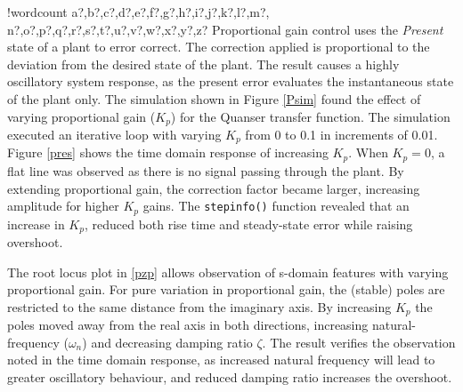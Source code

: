 \documentclass[11pt]{article}
\newcounter{words}
\newenvironment{counted}{%
  \setcounter{words}{0}
  \SearchList!{wordcount}{\stepcounter{words}}
    {a?,b?,c?,d?,e?,f?,g?,h?,i?,j?,k?,l?,m?,
    n?,o?,p?,q?,r?,s?,t?,u?,v?,w?,x?,y?,z?}
  \UndoBoundary{'}
  \SearchOrder{p;}}{%
  \StopSearching}
\begin{document}
\begin{counted}
Proportional gain control uses the \emph{Present} state of a plant to
error correct. The correction applied is proportional to the deviation
from the desired state of the plant. The result causes a highly
oscillatory system response, as the present error evaluates the
instantaneous state of the plant only. The simulation shown in Figure
\ref{Psim} found the effect of varying proportional gain (\(K_p\)) for
the Quanser transfer function. The simulation executed an iterative loop
with varying \(K_p\) from 0 to 0.1 in increments of 0.01. Figure
\ref{pres} shows the time domain response of increasing \(K_p\). When
\(K_p = 0\), a flat line was observed as there is no signal passing
through the plant. By extending proportional gain, the correction factor
became larger, increasing amplitude for higher \(K_p\) gains. The
\texttt{stepinfo()} function revealed that an increase in \(K_p\),
reduced both rise time and steady-state error while raising overshoot.

The root locus plot in \ref{pzp} allows observation of s-domain features
with varying proportional gain. For pure variation in proportional gain,
the (stable) poles are restricted to the same distance from the
imaginary axis. By increasing \(K_p\) the poles moved away from the real
axis in both directions, increasing natural-frequency (\(\omega_n\)) and
decreasing damping ratio \(\zeta\). The result verifies the observation
noted in the time domain response, as increased natural frequency will
lead to greater oscillatory behaviour, and reduced damping ratio
increases the overshoot.


\end{counted}
\end{document}
